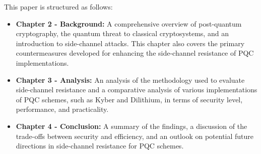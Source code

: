This paper is structured as follows:
\begin{itemize}
    \item \textbf{Chapter 2 - Background:} A comprehensive overview of post-quantum cryptography, the quantum threat to classical cryptosystems, and an introduction to side-channel attacks. This chapter also covers the primary countermeasures developed for enhancing the side-channel resistance of \ac{PQC} implementations.
    \item \textbf{Chapter 3 - Analysis:} An analysis of the methodology used to evaluate side-channel resistance and a comparative analysis of various implementations of \ac{PQC} schemes, such as Kyber and Dilithium, in terms of security level, performance, and practicality.
    \item \textbf{Chapter 4 - Conclusion:} A summary of the findings, a discussion of the trade-offs between security and efficiency, and an outlook on potential future directions in side-channel resistance for \ac{PQC} schemes.
\end{itemize}
